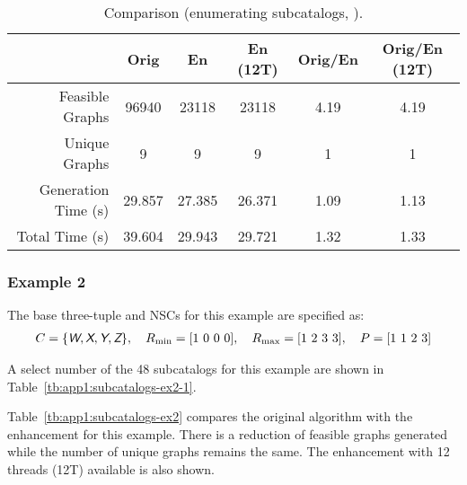 \vspace{-3ex}
\begin{table}[!ht]
\centering
\caption{Comparison (enumerating subcatalogs, ).\label{tb:app1:subcatalogs-ex1}}
\begin{tabular}{r | c | c | c | c | c}
\hline \hline
& Orig & En & En (12T) & Orig/En & Orig/En (12T) \\
\hline
Feasible Graphs & 96940 & 23118 & 23118 & 4.19 & 4.19 \\ 
Unique Graphs & 9 & 9 & 9 & 1 & 1 \\
Generation Time (s) & 29.857 & 27.385 & 26.371 & 1.09 & 1.13 \\
Total Time (s) & 39.604 & 29.943 & 29.721 & 1.32 & 1.33 \\
\hline \hline
\end{tabular}
\end{table}

\subsubsection{Example 2\label{sec:app1:subcatalogs-ex2}}

The base three-tuple and NSCs for this example are specified as:
\begin{align}
C = \{ \textsl{\textsf{W}}, \textsl{\textsf{X}}, \textsl{\textsf{Y}}, \textsl{\textsf{Z}}\}, \quad R_{\min} = [1\ 0\ 0\ 0], \quad R_{\max} = [1\ 2\ 3\ 3], \quad P = [1\ 1\ 2\ 3]
\end{align}

\noindent A select number of the 48 subcatalogs for this example are shown in Table~\ref{tb:app1:subcatalogs-ex2-1}.

Table~\ref{tb:app1:subcatalogs-ex2} compares the original algorithm with the enhancement for this example. There is a reduction of feasible graphs generated while the number of unique graphs remains the same. The enhancement with 12 threads (12T) available is also shown.


